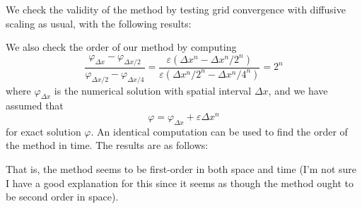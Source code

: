 \documentclass[12pt]{article}
\begin{document}
We check the validity of the method by testing grid convergence with diffusive scaling as usual, with the following results:
\begin{figure}[H]
\end{figure} 
\noindent We also check the order of our method by computing
\[\frac{\varphi_{\Delta x} - \varphi_{\Delta x/2}}{\varphi_{\Delta x/2} - \varphi_{\Delta x/4}} = \frac{\varepsilon\left(\Delta x^n - \Delta x^n/2^n\right)}{\varepsilon\left(\Delta x^n/2^n - \Delta x^n/4^n\right)} = 2^n\]
where $\varphi_{\Delta x}$ is the numerical solution with spatial interval $\Delta x$, and we have assumed that 
\[\varphi = \varphi_{\Delta x} + \varepsilon\Delta x^n\]
for exact solution $\varphi$. An identical computation can be used to find the order of the method in time. The results are as follows:
\begin{figure}[H]
\end{figure}
That is, the method seems to be first-order in both space and time (I'm not sure I have a good explanation for this since it seems as though the method ought to be second order in space).
\end{document}
